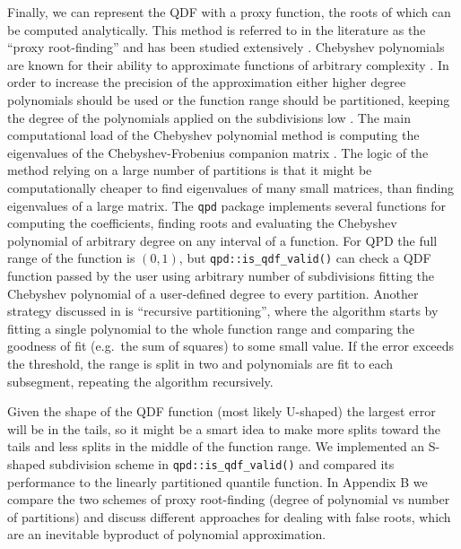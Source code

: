 \documentclass[ba]{imsart}
\numberwithin{equation}{section}
\theoremstyle{plain}
\begin{document}
Finally, we can represent the QDF with a proxy function, the roots of which can be computed analytically. This method is referred to in the literature as the ``proxy root-finding'' and has been studied extensively \citep{boyd2013FindingZerosUnivariate}. Chebyshev polynomials are known for their ability to approximate functions of arbitrary complexity \citep{boyd2007NumericalExperimentsAccuracy}. In order to increase the precision of the approximation either higher degree polynomials should be used or the function range should be partitioned, keeping the degree of the polynomials applied on the subdivisions low \citep{boyd2006ComputingRealRoots}. The main computational load of the Chebyshev polynomial method is computing the eigenvalues of the Chebyshev-Frobenius companion matrix \citep{boyd2013FindingZerosUnivariate}. The logic of the method relying on a large number of partitions is that it might be computationally cheaper to find eigenvalues of many small matrices, than finding eigenvalues of a large matrix. The \texttt{qpd} package \citep{perepolkin2019QpdToolsQuantileparameterized} implements several functions for computing the coefficients, finding roots and evaluating the Chebyshev polynomial of arbitrary degree on any interval of a function. For QPD the full range of the function is \((0,1)\), but \texttt{qpd::is\_qdf\_valid()} can check a QDF function passed by the user using arbitrary number of subdivisions fitting the Chebyshev polynomial of a user-defined degree to every partition. Another strategy discussed in \citet{boyd2013FindingZerosUnivariate} is ``recursive partitioning'', where the algorithm starts by fitting a single polynomial to the whole function range and comparing the goodness of fit (e.g.~the sum of squares) to some small value. If the error exceeds the threshold, the range is split in two and polynomials are fit to each subsegment, repeating the algorithm recursively.

Given the shape of the QDF function (most likely U-shaped) the largest error will be in the tails, so it might be a smart idea to make more splits toward the tails and less splits in the middle of the function range. We implemented an S-shaped subdivision scheme in \texttt{qpd::is\_qdf\_valid()} and compared its performance to the linearly partitioned quantile function. In Appendix B we compare the two schemes of proxy root-finding (degree of polynomial vs number of partitions) and discuss different approaches for dealing with false roots, which are an inevitable byproduct of polynomial approximation.
\end{document}
